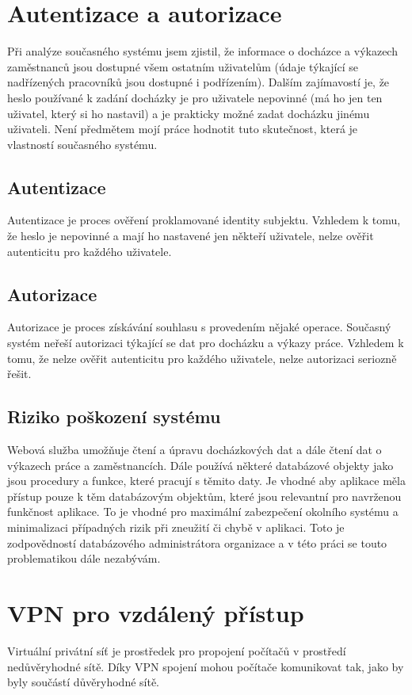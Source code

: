 \documentclass{bakalarka}
\begin{document}
\section{Autentizace a autorizace}
Při analýze současného systému jsem zjistil, že informace o docházce a výkazech zaměstnanců jsou dostupné všem ostatním uživatelům (údaje týkající se nadřízených pracovníků jsou dostupné i podřízením). Dalším zajímavostí je, že heslo používané k zadání docházky je pro uživatele nepovinné (má ho jen ten uživatel, který si ho nastavil) a je prakticky možné zadat docházku jinému uživateli. Není předmětem mojí práce hodnotit tuto skutečnost, která je vlastností současného systému.

\subsection*{Autentizace}
Autentizace je proces ověření proklamované identity subjektu. Vzhledem k tomu, že heslo je nepovinné a mají ho nastavené jen někteří uživatele, nelze ověřit autenticitu pro každého uživatele.

\subsection*{Autorizace}
Autorizace je proces získávání souhlasu s provedením nějaké operace. Současný systém neřeší autorizaci týkající se dat pro docházku a výkazy práce. Vzhledem k tomu, že nelze ověřit autenticitu pro každého uživatele, nelze autorizaci seriozně řešit.

\subsection*{Riziko poškození systému}
Webová služba umožňuje čtení a úpravu docházkových dat a dále čtení dat o výkazech práce a zaměstnancích. Dále používá některé databázové objekty jako jsou procedury a funkce, které pracují s těmito daty. Je vhodné aby aplikace měla přístup pouze k těm databázovým objektům, které jsou relevantní pro navrženou funkčnost aplikace. To je vhodné pro maximální zabezpečení okolního systému a minimalizaci případných rizik při zneužití či chybě v aplikaci. Toto je zodpovědností databázového administrátora organizace a v této práci se touto problematikou dále nezabývám.

\section{VPN pro vzdálený přístup}
Virtuální privátní síť  je prostředek pro propojení počítačů v prostředí nedůvěryhodné sítě. Díky VPN spojení mohou počítače komunikovat tak, jako by byly součástí důvěryhodné sítě.
\end{document}
